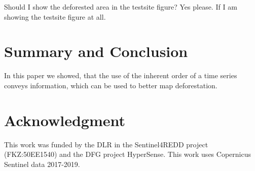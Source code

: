 \documentclass{article}
\begin{document}
Should I show the deforested area in the testsite figure?
Yes please. If I am showing the testsite figure at all.
\section{Summary and Conclusion}
In this paper we showed, that the use of the inherent order of a time series conveys information,
which can be used to better map deforestation.



\section*{Acknowledgment}
This work was funded by the DLR in the Sentinel4REDD project (FKZ:50EE1540) and
the DFG project HyperSense.
This work uses Copernicus Sentinel data 2017-2019.




\end{document}
